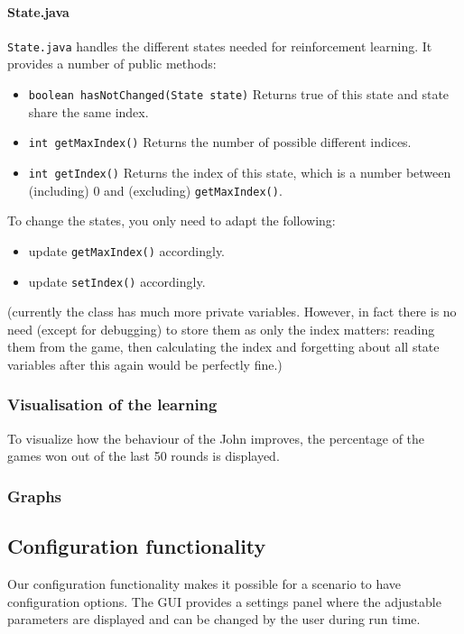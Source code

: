 \documentclass[a4paper,10pt]{scrartcl}
\begin{document}
\paragraph{State.java}
\verb|State.java| handles the different states needed for reinforcement learning. It provides a number of public methods:
\begin{itemize}
 \item \verb|boolean hasNotChanged(State state)| Returns true of this state and state share the same index.
 \item \verb|int getMaxIndex()| Returns the number of possible different indices.
 \item \verb|int getIndex()| Returns the index of this state, which is a number between (including) 0 and (excluding) \verb|getMaxIndex()|.
\end{itemize} 

To change the states, you only need to adapt the following:
\begin{itemize}
 \item update \verb|getMaxIndex()| accordingly.
 \item update \verb|setIndex()| accordingly.
\end{itemize}

(currently the class has much more private variables. However, in fact there is no need (except for debugging) to store them as only the index matters: reading them from the game, then calculating the index and forgetting about all state variables after this again would be perfectly fine.)

\subsubsection{Visualisation of the learning}
To visualize how the behaviour of the John improves, the percentage of the games won out of the last 50 rounds is displayed.


\subsubsection{Graphs}

\subsection{Configuration functionality}
Our configuration functionality makes it possible for a scenario to have configuration options. The GUI provides a settings panel where the adjustable parameters are displayed and can be changed by the user during run time.
\end{document}
